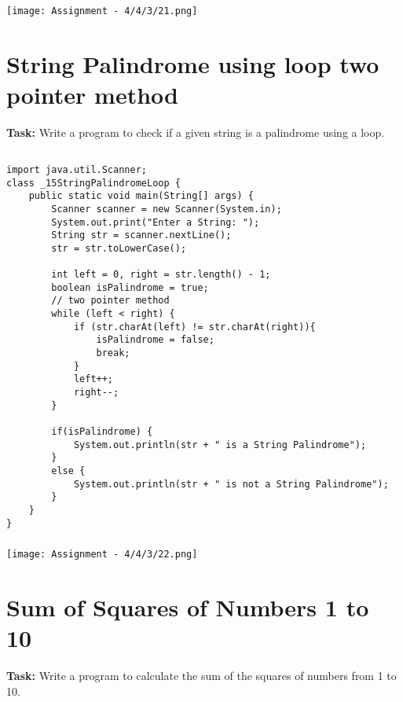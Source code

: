 \documentclass[12pt,a4paper]{article}
\begin{document}
\subsubsection{}
\begin{center}
    \texttt{[image: Assignment - 4/4/3/21.png]}
\end{center}


\section{String Palindrome using loop two pointer method}
\textbf{Task:} Write a program to check if a given string is a palindrome using a loop.

\subsection{}
\begin{lstlisting}
import java.util.Scanner;
class _15StringPalindromeLoop {
    public static void main(String[] args) {
        Scanner scanner = new Scanner(System.in);
        System.out.print("Enter a String: ");
        String str = scanner.nextLine();
        str = str.toLowerCase();
    
        int left = 0, right = str.length() - 1;
        boolean isPalindrome = true;
        // two pointer method
        while (left < right) {
            if (str.charAt(left) != str.charAt(right)){
                isPalindrome = false;
                break;
            }
            left++;
            right--;
        }
    
        if(isPalindrome) {
            System.out.println(str + " is a String Palindrome");
        }
        else {
            System.out.println(str + " is not a String Palindrome");
        }
    }
}
\end{lstlisting}

\subsubsection{}
\begin{center}
    \texttt{[image: Assignment - 4/4/3/22.png]}
\end{center}


\section{Sum of Squares of Numbers 1 to 10}
\textbf{Task:} Write a program to calculate the sum of the squares of numbers from 1 to 10.
\end{document}
